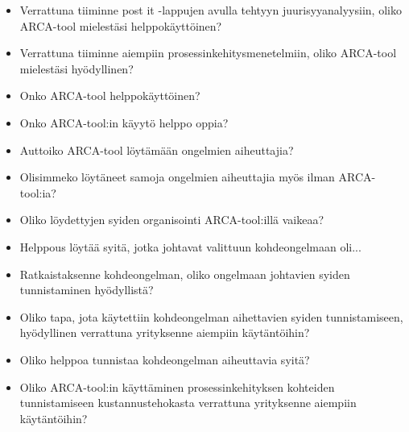 \begin{enumerate}
\begin{itemize}
	\item Verrattuna tiiminne post it -lappujen avulla tehtyyn juurisyyanalyysiin, oliko ARCA-tool mielestäsi helppokäyttöinen?
	\item Verrattuna tiiminne aiempiin prosessinkehitysmenetelmiin, oliko ARCA-tool mielestäsi hyödyllinen?
	\item Onko ARCA-tool helppokäyttöinen?
	\item Onko ARCA-tool:in käyytö helppo oppia?
	\item Auttoiko ARCA-tool löytämään ongelmien aiheuttajia?
	\item Olisimmeko löytäneet samoja ongelmien aiheuttajia myös ilman ARCA-tool:ia?
	\item Oliko löydettyjen syiden organisointi ARCA-tool:illä vaikeaa?
	\item Helppous löytää syitä, jotka johtavat valittuun kohdeongelmaan oli...
	\item Ratkaistaksenne kohdeongelman, oliko ongelmaan johtavien syiden tunnistaminen hyödyllistä?
	\item Oliko tapa, jota käytettiin kohdeongelman aihettavien syiden tunnistamiseen, hyödyllinen verrattuna yrityksenne aiempiin käytäntöihin?
	\item Oliko helppoa tunnistaa kohdeongelman aiheuttavia syitä?
	\item Oliko ARCA-tool:in käyttäminen prosessinkehityksen kohteiden tunnistamiseen kustannustehokasta verrattuna yrityksenne aiempiin käytäntöihin?
  \end{itemize}
\end{enumerate}


